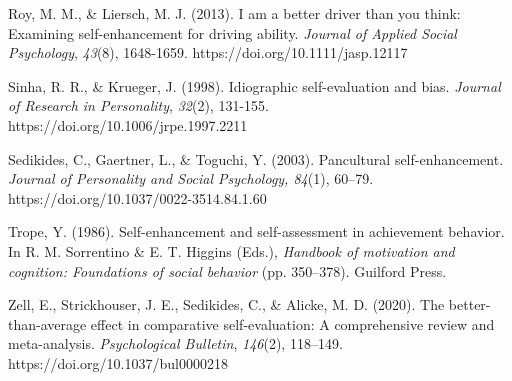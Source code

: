 \documentclass[authordate, anecdote]{jote-new-article}
\begin{document}
	Roy, M. M., \& Liersch, M. J. (2013). I am a better driver than you think: Examining self-enhancement for driving ability. \emph{Journal of Applied Social Psychology}, \emph{43}(8), 1648-1659. https://doi.org/10.1111/jasp.12117



	Sinha, R. R., \& Krueger, J. (1998). Idiographic self-evaluation and bias. \emph{Journal of Research in Personality}, \emph{32}(2), 131-155. https://doi.org/10.1006/jrpe.1997.2211



	Sedikides, C., Gaertner, L., \& Toguchi, Y. (2003). Pancultural self-enhancement. \emph{Journal of Personality and Social Psychology, 84}(1), 60--79. https://doi.org/10.1037/0022-3514.84.1.60



	Trope, Y. (1986). Self-enhancement and self-assessment in achievement behavior. In R. M. Sorrentino \& E. T. Higgins (Eds.), \emph{Handbook of motivation and cognition: Foundations of social behavior} (pp. 350--378). Guilford Press.



	Zell, E., Strickhouser, J. E., Sedikides, C., \& Alicke, M. D. (2020). The better-than-average effect in comparative self-evaluation: A comprehensive review and meta-analysis. \emph{Psychological Bulletin}, \emph{146}(2), 118--149. https://doi.org/10.1037/bul0000218
\end{document}
